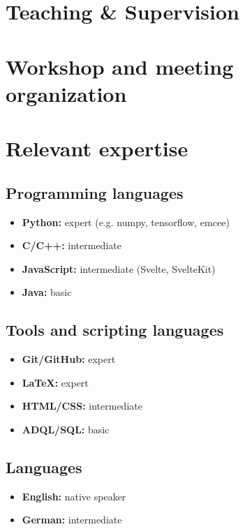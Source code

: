 \documentclass[12pt, letterpaper]{hunt-cv}
\begin{document}
\section*{Teaching \& Supervision}


\section*{Workshop and meeting organization}


\section*{Relevant expertise}

\subsection*{Programming languages}

\begin{itemize}
    \item \textbf{Python:} expert (e.g. numpy, tensorflow, emcee)
    \item \textbf{C/C++:} intermediate
    \item \textbf{JavaScript:} intermediate (Svelte, SvelteKit)
    \item \textbf{Java:} basic
\end{itemize}

\subsection*{Tools and scripting languages}

\begin{itemize}
    \item \textbf{Git/GitHub:} expert
    \item \textbf{LaTeX:} expert
    \item \textbf{HTML/CSS:} intermediate
    \item \textbf{ADQL/SQL:} basic
\end{itemize}

\subsection*{Languages}

\begin{itemize}
    \item \textbf{English:} native speaker
    \item \textbf{German:} intermediate
\end{itemize}
\end{document}
